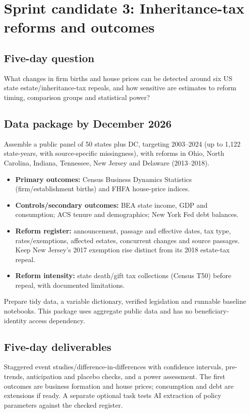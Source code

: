 \section{Sprint candidate 3: Inheritance-tax reforms and outcomes}
\label{sec:tax}

\subsection{Five-day question}
What changes in firm births and house prices can be detected around six US state estate/inheritance-tax repeals, and how sensitive are estimates to reform timing, comparison groups and statistical power?

\subsection{Data package by December 2026}
Assemble a public panel of 50 states plus DC, targeting 2003--2024 (up to 1,122 state-years, with source-specific missingness), with reforms in Ohio, North Carolina, Indiana, Tennessee, New Jersey and Delaware (2013--2018).

\begin{itemize}[nosep]
\item \textbf{Primary outcomes:} Census Business Dynamics Statistics (firm/establishment births) and FHFA house-price indices.
\item \textbf{Controls/secondary outcomes:} BEA state income, GDP and consumption; ACS tenure and demographics; New York Fed debt balances.
\item \textbf{Reform register:} announcement, passage and effective dates, tax type, rates/exemptions, affected estates, concurrent changes and source passages. Keep New Jersey's 2017 exemption rise distinct from its 2018 estate-tax repeal.
\item \textbf{Reform intensity:} state death/gift tax collections (Census T50) before repeal, with documented limitations.
\end{itemize}

Prepare tidy data, a variable dictionary, verified legislation and runnable baseline notebooks. This package uses aggregate public data and has no beneficiary-identity access dependency.

\subsection{Five-day deliverables}
Staggered event studies/difference-in-differences with confidence intervals, pre-trends, anticipation and placebo checks, and a power assessment. The first outcomes are business formation and house prices; consumption and debt are extensions if ready. A separate optional task tests AI extraction of policy parameters against the checked register.

